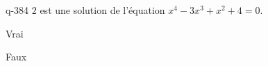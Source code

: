 \begin{truefalse}{q-384}
$2$ est une solution de l'équation $x^4-3x^3+x^2+4=0$.
\item* Vrai
\item Faux
\end{truefalse}

